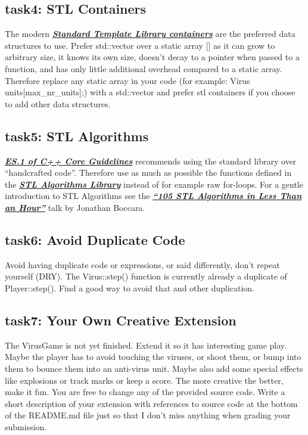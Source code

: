 \documentclass[12pt]{article}
\newcommand*{\link}[2]{\href{#1}{\color{blue}\textbf{\textit{#2}}}}
\begin{document}
\subsection{task4: STL Containers}
The modern \link{http://www.cplusplus.com/reference/stl/}{Standard
  Template Library containers} are the preferred data structures to
use. Prefer std::vector over a static array [] as it can grow to
arbitrary size, it knows its own size, doesn't decay to a pointer when
passed to a function, and has only little additional overhead compared
to a static array. Therefore replace any static array in your code
(for example: Virus units[max\_nr\_units];) with a std::vector and
prefer stl containers if you choose to add other data structures.

\subsection{task5: STL Algorithms}
\link{https://isocpp.github.io/CppCoreGuidelines/CppCoreGuidelines\#Res-lib}
{ES.1 of C++ Core Guidelines} recommends using the standard library
over ``handcrafted code''.  Therefore use as much as possible the
functions defined in the
\link{https://en.cppreference.com/w/cpp/algorithm} {STL Algorithms
  Library} instead of for example raw for-loops. For a gentle
introduction to STL Algorithms see the
\link{https://www.youtube.com/watch?v=2olsGf6JIkU} {``105 STL
  Algorithms in Less Than an Hour''} talk by Jonathan Boccara.

\subsection{task6: Avoid Duplicate Code}
Avoid having duplicate code or expressions, or said differently, don't
repeat yourself (DRY). The Virus::step() function is currently already
a duplicate of Player::step(). Find a good way to avoid that and other
duplication.

\subsection{task7: Your Own Creative Extension}
The VirusGame is not yet finished. Extend it so it has interesting
game play. Maybe the player has to avoid touching the viruses, or
shoot them, or bump into them to bounce them into an anti-virus
unit. Maybe also add some special effects like explosions or track
marks or keep a score. The more creative the better, make it fun. You
are free to change any of the provided source code. Write a short
description of your extension with references to source code at the
bottom of the README.md file just so that I don't miss anything when
grading your submission.
\end{document}

